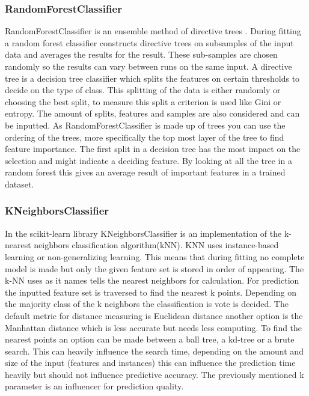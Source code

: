 \documentclass[a4paper,10pt]{article}
\begin{document}
\subsubsection{RandomForestClassifier}
RandomForestClassifier is an ensemble method of directive trees \cite{RDF}. During fitting a random forest classifier constructs directive trees on subsamples of the input data and averages the results for the result. These sub-samples are chosen randomly so the results can vary between runs on the same input. A directive tree is a decision tree classifier which splits the features on certain thresholds to decide on the type of class. This splitting of the data is either randomly or choosing the best split, to measure this split a criterion is used like Gini or entropy. The amount of splits, features and samples are also considered and can be inputted. As RandomForestClassifier is made up of trees you can use the ordering of the trees, more specifically the top most layer of the tree to find feature importance. The first split in a decision tree has the most impact on the selection and might indicate a deciding feature. By looking at all the tree in a random forest this gives an average result of important features in a trained dataset.


\subsubsection{KNeighborsClassifier}
In the scikit-learn library KNeighborsClassifier is an implementation of the k-nearest neighbors classification algorithm(kNN)\cite{KNN}. KNN uses instance-based learning or non-generalizing learning. This means that during fitting no complete model is made but only the given feature set is stored in order of appearing. The k-NN uses as it names tells the nearest neighbors for calculation. For prediction the inputted feature set is traversed to find the nearest  k points. Depending on the majority class of the k neighbors the classification is vote is decided. The default metric for distance measuring is Euclidean distance another option is the Manhattan distance which is less accurate but needs less computing. To find the nearest points an option can be made between a ball tree, a kd-tree or a brute search. This can heavily influence the search time, depending on the amount and size of the input (features and instances) this can influence the prediction time heavily but should not influence predictive accuracy. The previously mentioned k parameter is an influencer for prediction quality.\cite{KNN-k}
\end{document}
